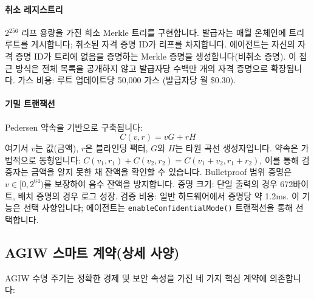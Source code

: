 \documentclass[11pt]{article}
\begin{document}
\paragraph{취소 레지스트리} 2$^{256}$ 리프 용량을 가진 희소 Merkle 트리를 구현합니다. 발급자는 매월 온체인에 트리 루트를 게시합니다; 취소된 자격 증명 ID가 리프를 차지합니다. 에이전트는 자신의 자격 증명 ID가 트리에 없음을 증명하는 Merkle 증명을 생성합니다(비취소 증명). 이 접근 방식은 전체 목록을 공개하지 않고 발급자당 수백만 개의 자격 증명으로 확장됩니다. 가스 비용: 루트 업데이트당 50,000 가스 (발급자당 월 \$0.30).

\paragraph{기밀 트랜잭션} Pedersen 약속을 기반으로 구축됩니다:
\begin{equation}
C(v, r) = vG + rH
\end{equation}
여기서 $v$는 값(금액), $r$은 블라인딩 팩터, $G$와 $H$는 타원 곡선 생성자입니다. 약속은 가법적으로 동형입니다: $C(v_1, r_1) + C(v_2, r_2) = C(v_1 + v_2, r_1 + r_2)$, 이를 통해 검증자는 금액을 알지 못한 채 잔액을 확인할 수 있습니다. Bulletproof 범위 증명은 $v \in [0, 2^{64})$를 보장하여 음수 잔액을 방지합니다. 증명 크기: 단일 출력의 경우 672바이트, 배치 증명의 경우 로그 성장. 검증 비용: 일반 하드웨어에서 증명당 약 1.2ms. 이 기능은 선택 사항입니다; 에이전트는 \texttt{enableConfidentialMode()} 트랜잭션을 통해 선택합니다.

\subsection{AGIW 스마트 계약(상세 사양)}
\label{sec:agiw-contracts}
AGIW 수명 주기는 정확한 경제 및 보안 속성을 가진 네 가지 핵심 계약에 의존합니다:
\end{document}
